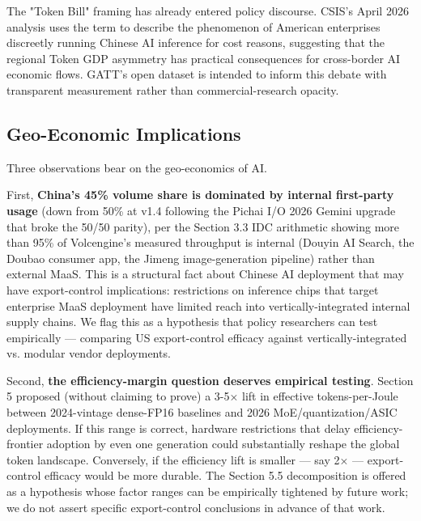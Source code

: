 \documentclass[11pt,a4paper]{article}
\begin{document}
The "Token Bill" framing has already entered policy discourse. CSIS's April 2026 analysis \cite{csis2026tokenbill} uses the term to describe the phenomenon of American enterprises discreetly running Chinese AI inference for cost reasons, suggesting that the regional Token GDP asymmetry has practical consequences for cross-border AI economic flows. GATT's open dataset is intended to inform this debate with transparent measurement rather than commercial-research opacity.

\subsection{Geo-Economic Implications}

Three observations bear on the geo-economics of AI.

First, \textbf{China's 45\% volume share is dominated by internal first-party usage} (down from 50\% at v1.4 following the Pichai I/O 2026 Gemini upgrade \cite{pichai2026io} that broke the 50/50 parity), per the Section 3.3 IDC arithmetic showing more than 95\% of Volcengine's measured throughput is internal (Douyin AI Search, the Doubao consumer app, the Jimeng image-generation pipeline) rather than external MaaS. This is a structural fact about Chinese AI deployment that may have export-control implications: restrictions on inference chips that target enterprise MaaS deployment have limited reach into vertically-integrated internal supply chains. We flag this as a hypothesis that policy researchers can test empirically --- comparing US export-control efficacy against vertically-integrated vs. modular vendor deployments.

Second, \textbf{the efficiency-margin question deserves empirical testing}. Section 5 proposed (without claiming to prove) a 3-5× lift in effective tokens-per-Joule between 2024-vintage dense-FP16 baselines and 2026 MoE/quantization/ASIC deployments. If this range is correct, hardware restrictions that delay efficiency-frontier adoption by even one generation could substantially reshape the global token landscape. Conversely, if the efficiency lift is smaller --- say 2× --- export-control efficacy would be more durable. The Section 5.5 decomposition is offered as a hypothesis whose factor ranges can be empirically tightened by future work; we do not assert specific export-control conclusions in advance of that work.
\end{document}
